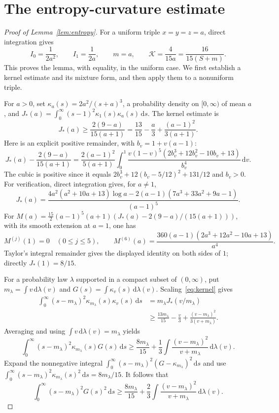 \documentclass[11pt]{article}
\numberwithin{equation}{section}
\newcommand{\dd}{\,\mathrm d}
\newcommand{\K}{\mathcal K}
\begin{document}
\section{The entropy-curvature estimate}\label{app:entropy}
\begin{proof}[Proof of Lemma~\ref{lem:entropy}]
For a uniform triple $x=y=z=a$, direct integration gives
\[
 I_0=\frac1{2a^2},\qquad I_1=\frac1{2a},\qquad
 m=a,\qquad \K=\frac4{15a}=\frac{16}{15(S+m)}.
\]
This proves the lemma, with equality, in the uniform case. We first establish
a kernel estimate and its mixture form, and then apply them to a nonuniform
triple.

For $a>0$, set $\kappa_a(s)=2a^2/(s+a)^3$, a probability density on
$[0,\infty)$ of mean $a$, and
$J_*(a)=\int_0^\infty(s-1)^2\kappa_1(s)\kappa_a(s)\dd s$.
The kernel estimate is
\begin{equation}\label{eq:kernel}
 J_*(a)\ge\frac{2(9-a)}{15(a+1)}
 =\frac{13}{15}-\frac a3+\frac{(a-1)^2}{3(a+1)}.
\end{equation}
Here is an explicit positive remainder, with $b_v=1+v(a-1)$:
\[
 J_*(a)-\frac{2(9-a)}{15(a+1)}
 =\frac{2(a-1)^2}{5(a+1)}\int_0^1
 \frac{v(1-v)^5(2b_v^3+12b_v^2-10b_v+13)}{b_v^4}\dd v.
\]
The cubic is positive since it equals
$2b_v^3+12(b_v-5/12)^2+131/12$ and $b_v>0$.
For verification, direct integration gives, for $a\ne1$,
\[
 J_*(a)=\frac{4a^2(a^2+10a+13)\log a
       -2(a-1)(7a^3+33a^2+9a-1)}{(a-1)^5}.
\]
For $M(a)=\frac{15}{2}(a-1)^5(a+1)(J_*(a)-2(9-a)/(15(a+1)))$, with
its smooth extension at $a=1$, one has
\[
 M^{(j)}(1)=0\quad(0\le j\le5),\qquad
 M^{(6)}(a)=\frac{360(a-1)(2a^3+12a^2-10a+13)}{a^4}.
\]
Taylor's integral remainder gives the displayed identity on both sides
of $1$; directly $J_*(1)=8/15$.

For a probability law $\lambda$ supported in a compact subset of $(0,\infty)$,
put $m_\lambda=\int v\dd\lambda(v)$ and
$G(s)=\int\kappa_v(s)\dd\lambda(v)$. Scaling~\eqref{eq:kernel} gives
\[
\begin{aligned}
 \int_0^\infty(s-m_\lambda)^2\kappa_{m_\lambda}(s)\kappa_v(s)\dd s
 &=m_\lambda J_*(v/m_\lambda)\\
 &\ge\frac{13m_\lambda}{15}-\frac v3
       +\frac{(v-m_\lambda)^2}{3(v+m_\lambda)}.
\end{aligned}
\]
Averaging and using $\int v\dd\lambda(v)=m_\lambda$ yields
\[
 \int_0^\infty(s-m_\lambda)^2\kappa_{m_\lambda}(s)G(s)\dd s
 \ge\frac{8m_\lambda}{15}
    +\frac13\int\frac{(v-m_\lambda)^2}{v+m_\lambda}\dd\lambda(v).
\]
Expand the nonnegative integral
$\int_0^\infty(s-m_\lambda)^2(G-\kappa_{m_\lambda})^2\dd s$ and use
$\int_0^\infty(s-m_\lambda)^2\kappa_{m_\lambda}(s)^2\dd s=8m_\lambda/15$.
It follows that
\begin{equation}\label{eq:mixture}
 \int_0^\infty(s-m_\lambda)^2G(s)^2\dd s
 \ge\frac{8m_\lambda}{15}
      +\frac23\int\frac{(v-m_\lambda)^2}{v+m_\lambda}\dd\lambda(v).
\end{equation}


\end{proof}
\end{document}
